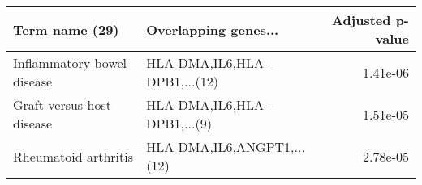 \begin{tabular}{llr}
\toprule
            Term name (29) &         Overlapping genes... &  Adjusted p-value \\
\midrule
Inflammatory bowel disease & HLA-DMA,IL6,HLA-DPB1,...(12) &          1.41e-06 \\
 Graft-versus-host disease &  HLA-DMA,IL6,HLA-DPB1,...(9) &          1.51e-05 \\
      Rheumatoid arthritis &   HLA-DMA,IL6,ANGPT1,...(12) &          2.78e-05 \\
\bottomrule
\end{tabular}
